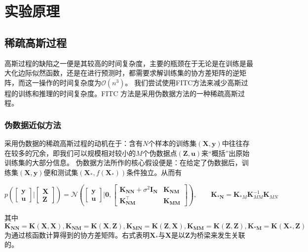 \section{实验原理}
\subsection{稀疏高斯过程}
高斯过程的缺陷之一便是其较高的时间复杂度，主要的瓶颈在于无论是在训练是最大化边际似然函数，还是在进行预测时，都需要求解训练集的协方差矩阵的逆矩阵，而这一操作的时间复杂度为$\mathcal{O}(n^3)$。
我们尝试使用FITC方法来减少高斯过程的训练和推理的时间复杂度。FITC 方法是采用伪数据方法的一种稀疏高斯过程。
\subsubsection{伪数据近似方法}

采用伪数据的稀疏高斯过程的动机在于：含有$N$个样本的训练集$(\mathbf{X},\mathbf{y})$中往往存在较多的冗余，即我们可以规模相对较小的$M$个伪数据点$(\mathbf{Z},\mathbf{u})$来“概括”出原始训练集的大部分信息。
伪数据方法所作的核心假设便是：在给定了伪数据后，训练集$(\mathbf{X},\mathbf{y})$便和测试集$(\mathbf{X}_*,f(\mathbf{X}_*))$条件独立。从而有

\[
      p\left(
            \begin{bmatrix}
            \mathbf{y} \\ \mathbf{u}
            \end{bmatrix}
            \Bigg| 
            \begin{bmatrix}
            \mathbf{X} \\ \mathbf{Z}
            \end{bmatrix}
            \right)
            =
            \mathcal{N}\left(
            \begin{bmatrix}
            \mathbf{y} \\ \mathbf{u}
            \end{bmatrix}\Bigg|
            \mathbf{0}, 
            \begin{bmatrix}
            \mathbf{K}_{\mathbf{NN}}+\sigma^2\mathbf{I}_{\mathbf{N}} & \mathbf{K}_{\mathbf{NM}} \\
            \mathbf{K}_{\mathbf{NM}}^\top & \mathbf{K}_{\mathbf{MM}}
            \end{bmatrix}
            \right),\qquad \mathbf{K}_{*\mathbf{N}} = \mathbf{K}_{*M}\mathbf{K}_{MM}^{-1}\mathbf{K}_{MN}
\]

其中$\mathbf{K}_{\mathbf{NN}} = \mathbf{K}(\mathbf{X}, \mathbf{X}),
\mathbf{K}_{\mathbf{NM}} = \mathbf{K}(\mathbf{X}, \mathbf{Z}),
\mathbf{K}_{\mathbf{MN}} = \mathbf{K}(\mathbf{Z}, \mathbf{X}),
\mathbf{K}_{\mathbf{MM}} = \mathbf{K}(\mathbf{Z}, \mathbf{Z}),
\mathbf{K}_{\mathbf{*M}} = \mathbf{K}(\mathbf{X}_*, \mathbf{Z})$为通过核函数计算得到的协方差矩阵。右式表明$\mathbf{X}_*$与$\mathbf{X}$是以$\mathbf{Z}$为桥梁来发生关联的。

